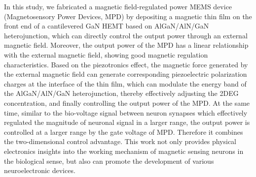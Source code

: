 \noindent In this study, we fabricated a  magnetic field-regulated power MEMS device (Magnetosensory Power Devices, MPD)  by depositing a magnetic thin film  on the front end of a cantilevered  GaN HEMT  based on  AlGaN/AlN/GaN heterojunction, which can directly control the output power  through an external magnetic field. Moreover, the output power of the MPD has a linear relationship with the external magnetic field, showing good magnetic regulation characteristics. Based on the piezotronics  effect, the magnetic force  generated by the external magnetic field can generate corresponding piezoelectric polarization charges  at the interface  of the  thin film, which can modulate  the energy band  of the AlGaN/AlN/GaN heterojunction, thereby effectively adjusting the 2DEG  concentration, and finally controlling the output power  of the MPD. At the same time, similar to the bio-voltage signal between neuron synapses which effectively regulated the magnitude of neuronal signal in a larger range, the output power is controlled at a larger range by the gate voltage  of MPD. Therefore it combines the two-dimensional control advantage. This work not only provides physical electronics insights into the working mechanism of magnetic sensing neurons in the biological sense, but also can promote the development of various neuroelectronic devices.\\

